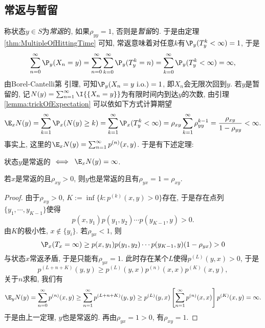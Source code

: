 \documentclass[a4paper, 10pt]{ctexart}
\begin{document}
\subsection{常返与暂留}
称状态$y \in S$为\emph{常返}的, 如果$\rho_{yy} = 1$, 否则是\emph{暂留}的. 
于是由定理 \ref{thm:MultipleOfHittingTime} 可知, 常返意味着对任意$k$有$\P_y(T_y^k < \infty) = 1$, 于是
\begin{equation*}
	\sum_{n=0}^{\infty} \P_y(X_n = y) 
	= \sum_{n=0}^{\infty} \sum_{k=0}^{\infty} \P_y(T_y^k = n)
	= \sum_{k=0}^{\infty} \P_y(T_y^k < \infty) 
	= \infty, 
\end{equation*}
由Borel-Cantelli第 \uppercase\expandafter{} 引理, 
可知$\P_y(X_n = y \text{ i.o.} ) =1$, 即$X_n$会无限次回到$y$. 
若$y$是暂留的, 记$N(y) = \sum_{n = 1}^{\infty} \I{\{X_n = y\}}$为有限时间内到达$y$的次数, 由引理 \ref{lemma:trickOfExpectation} 可以依如下方式计算期望
\begin{equation*}
	\E_x N(y)
	= \sum_{k=1}^{\infty} \P_x(N(y) \geq k)
	= \sum_{k=1}^{\infty} \P_x(T_y^k < \infty)
	= \rho_{xy} \sum_{k=1}^{\infty} \rho_{yy}^{k-1} 
	= \frac{\rho_{xy}}{1- \rho_{yy}} < \infty. 
\end{equation*}
事实上, 这里的$\E_x N(y) = \sum_{n = 1}^{\infty} p^{(n)}(x, y)$. 
于是有下述定理: 
\begin{theorem} 
	状态$y$是常返的 $\; \Longleftrightarrow \;\; \E_x N(y) = \infty$.  
\end{theorem}

\begin{theorem}[常返的传染性]\label{thm:contagious}
	若$x$是常返的且$\rho_{xy} > 0$, 则$y$也是常返的且有$\rho_{yx} = 1 = \rho_{xy}$. 
\end{theorem}
\begin{proof}
	由于$\rho_{xy} > 0$, $K := \inf\{k \colon p^{(k)}(x,y) > 0\}$存在, 于是存在点列$\{y_1, \cdots, y_{K-1}\}$使得
	\begin{equation*}
		p(x, y_1) p(y_1, y_2) \cdots p(y_{K - 1}, y) > 0. 
	\end{equation*}
	由$K$的极小性, $x \notin \{y_i\}$. 
	若$\rho_{yx} < 1$, 则
	\begin{equation*}
		\P_x(T_x = \infty) 
		\geq p(x, y_1) p(y_1, y_2) \cdots p(y_{K - 1}, y) (1 - \rho_{y x}) 
		> 0
	\end{equation*}
	与状态$x$常返矛盾, 于是只能有$\rho_{yx} = 1$. 
	此时存在某个$L$使得$p^{(L)}(y, x) > 0$, 于是
	\begin{equation*}
		p^{(L + n + K)}(y, y) 
		\geq p^{(L)}(y, x) p^{(n)}(x, x) p^{(K)}(x, y), 
	\end{equation*}
	关于$n$求和, 我们有
	\begin{equation*}
		\E_y N(y)
		= \sum_{n=0}^{\infty} p^{(n)}(x, y)
		\geq \sum_{n = 1}^{\infty} p^{(L + n + K)}(y, y) 
		\geq p^{(L)}(y, x) \left[\sum_{n = 1}^{\infty} p^{(n)}(x, x)\right] p^{(K)}(x, y)
		= \infty. 
	\end{equation*}
	于是由上一定理, $y$也是常返的. 
	再由$\rho_{yx} = 1 > 0$, 有$\rho_{xy} = 1$. 
\end{proof}
\end{document}
